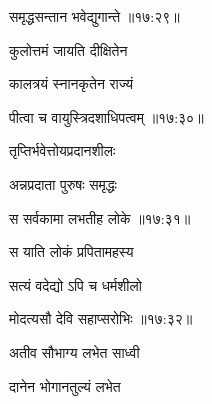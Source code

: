 \nemslokad

{\devanagarifontbold समृद्धसन्तान भवेद्युगान्ते {॥१७:२९॥} \veg\dontdisplaylinenum }%
 
\ujvers{}

\nemslokab

{\devanagarifontbold कुलोत्तमं जायति दीक्षितेन  \danda\dontdisplaylinenum }%
 
\nemslokac

{\devanagarifontbold कालत्रयं स्नानकृतेन राज्यं }%
  \dontdisplaylinenum

\nemslokad

{\devanagarifontbold पीत्वा च वायुस्त्रिदशाधिपत्वम् {॥१७:३०॥} \veg\dontdisplaylinenum }%
 
\ujvers{}

\nemslokab

{\devanagarifontbold तृप्तिर्भवेत्तोयप्रदानशीलः  \danda\dontdisplaylinenum }%
 
\nemslokac

{\devanagarifontbold अन्नप्रदाता पुरुषः समृद्धः }%
  \dontdisplaylinenum

\nemslokad

{\devanagarifontbold स सर्वकामा लभतीह लोके {॥१७:३१॥} \veg\dontdisplaylinenum }%
 
\ujvers{}

\nemslokab

{\devanagarifontbold स याति लोकं प्रपितामहस्य  \danda\dontdisplaylinenum }%
 
\nemslokac

{\devanagarifontbold सत्यं वदेद्यो ऽपि च धर्मशीलो }%
  \dontdisplaylinenum

\nemslokad

{\devanagarifontbold मोदत्यसौ देवि सहाप्सरोभिः {॥१७:३२॥} \veg\dontdisplaylinenum }%
 
\ujvers{}

\nemslokab

{\devanagarifontbold अतीव सौभाग्य लभेत साध्वी  \danda\dontdisplaylinenum }%
 
\nemslokac

{\devanagarifontbold दानेन भोगानतुल्यं लभेत }%
  \dontdisplaylinenum

\nemslokad

